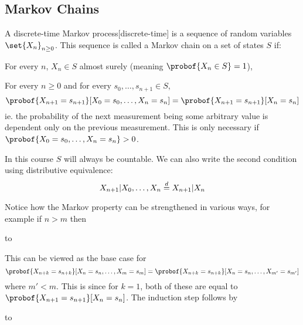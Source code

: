 \subsection{Markov Chains}

\bdefn

    A {\emphcolor discrete-time Markov process}[discrete-time] is a sequence of random variables $\set{X_n}_{n\geq0}$.
    This sequence is called a {\emphcolor Markov chain} on a set of states $S$ if:
    \benum
        \item For every $n$, $X_n\in S$ almost surely (meaning $\probof{X_n\in S}=1$),
        \item For every $n\geq0$ and for every $s_0,\dots,s_{n+1}\in S$,
        $$\probof{X_{n+1}=s_{n+1}}[X_0=s_0,\dots,X_n=s_n]=\probof{X_{n+1}=s_{n+1}}[X_n=s_n]$$
        ie. the probability of the next measurement being some arbitrary value is dependent only on the previous measurement.
        This is only necessary if $\probof{X_0=s_0,\dots,X_n=s_n}>0$.
    \eenum

\edefn

In this course $S$ will always be countable.
We can also write the second condition using distributive equivalence:
$$ X_{n+1}\vert X_0,\dots,X_n \deq X_{n+1}\vert X_n $$

Notice how the Markov property can be strengthened in various ways, for example if $n>m$ then

\medskip
{\tabskip=0pt
\jot\halign to}
\medskip

This can be viewed as the base case for
$$ \probof{X_{n+k}=s_{n+k}}[X_n=s_n,\dots,X_m=s_m] = \probof{X_{n+k}=s_{n+k}}[X_n=s_n,\dots,X_{m'}=s_{m'}] $$
where $m'<m$.
This is since for $k=1$, both of these are equal to $\probof{X_{n+1}=s_{n+1}}[X_n=s_n]$.
The induction step follows by

\medskip
{\tabskip=0pt
\jot\halign to}
\medskip


